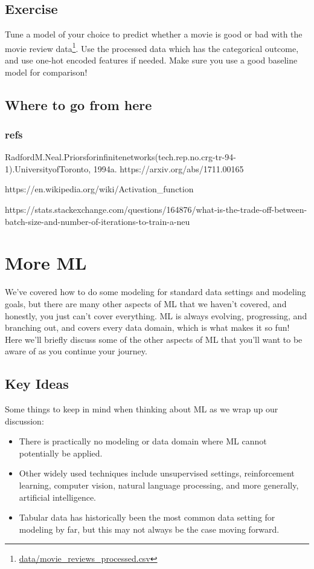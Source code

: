 \documentclass[
  letterpaper,
]{krantz}
\providecommand{\tightlist}{%
  \setlength{\itemsep}{0pt}\setlength{\parskip}{0pt}}\usepackage{longtable,booktabs,array}
\DeclareRobustCommand{\href}[2]{#2\footnote{\url{#1}}}
\begin{document}
\section{Exercise}\label{exercise-1}

Tune a model of your choice to predict whether a movie is good or bad
with the \href{data/movie_reviews_processed.csv}{movie review data}. Use
the processed data which has the categorical outcome, and use one-hot
encoded features if needed. Make sure you use a good baseline model for
comparison!

\section{Where to go from here}\label{where-to-go-from-here-1}

\subsection{refs}\label{refs-2}

RadfordM.Neal.Priorsforinfinitenetworks(tech.rep.no.crg-tr-94-1).UniversityofToronto,
1994a. https://arxiv.org/abs/1711.00165

https://en.wikipedia.org/wiki/Activation\_function

https://stats.stackexchange.com/questions/164876/what-is-the-trade-off-between-batch-size-and-number-of-iterations-to-train-a-neu

\chapter{More ML}\label{sec-ml-more}

We've covered how to do some modeling for standard data settings and
modeling goals, but there are many other aspects of ML that we haven't
covered, and honestly, you just can't cover everything. ML is always
evolving, progressing, and branching out, and covers every data domain,
which is what makes it so fun! Here we'll briefly discuss some of the
other aspects of ML that you'll want to be aware of as you continue your
journey.

\section{Key Ideas}\label{key-ideas-3}

Some things to keep in mind when thinking about ML as we wrap up our
discussion:

\begin{itemize}
\tightlist
\item
  There is practically no modeling or data domain where ML cannot
  potentially be applied.
\item
  Other widely used techniques include unsupervised settings,
  reinforcement learning, computer vision, natural language processing,
  and more generally, artificial intelligence.
\item
  Tabular data has historically been the most common data setting for
  modeling by far, but this may not always be the case moving forward.
\end{itemize}
\end{document}
